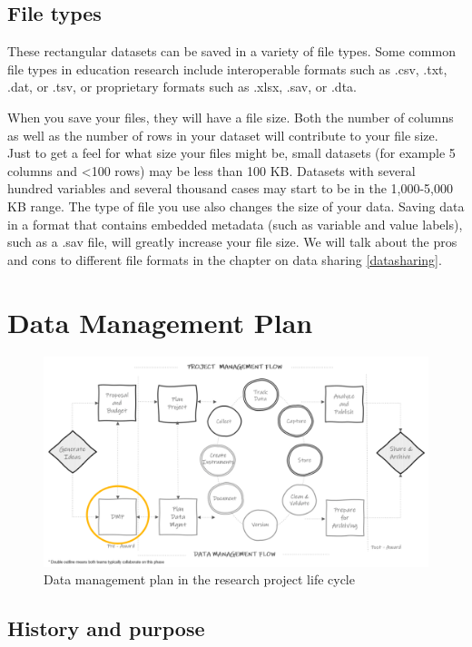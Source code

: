 \documentclass[
]{book}
\begin{document}
\hypertarget{file-types}{%
\section{File types}\label{file-types}}

These rectangular datasets can be saved in a variety of file types. Some common file types in education research include interoperable formats such as .csv, .txt, .dat, or .tsv, or proprietary formats such as .xlsx, .sav, or .dta.

When you save your files, they will have a file size. Both the number of columns as well as the number of rows in your dataset will contribute to your file size. Just to get a feel for what size your files might be, small datasets (for example 5 columns and \textless100 rows) may be less than 100 KB. Datasets with several hundred variables and several thousand cases may start to be in the 1,000-5,000 KB range. The type of file you use also changes the size of your data. Saving data in a format that contains embedded metadata (such as variable and value labels), such as a .sav file, will greatly increase your file size. We will talk about the pros and cons to different file formats in the chapter on data sharing \ref{datasharing}.

\hypertarget{data-management-plan}{%
\chapter{Data Management Plan}\label{data-management-plan}}

\begin{figure}

{\centering \includegraphics[width=0.7\linewidth]{img/lifecycle_dmp} 

}

\caption{Data management plan in the research project life cycle}\label{fig:unnamed-chunk-1}
\end{figure}

\hypertarget{history-and-purpose}{%
\section{History and purpose}\label{history-and-purpose}}
\end{document}
